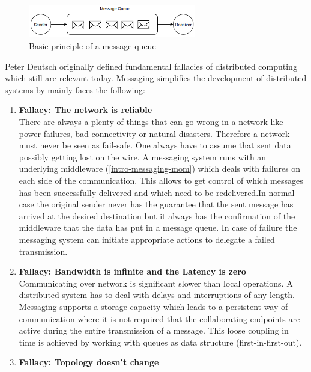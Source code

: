 \begin{figure}[H]
    \centering
    \includegraphics[width=0.65\textwidth]{images/messaging-simple.png}
    \caption{Basic principle of a message queue}
    \label{fig:messaging-simple}
\end{figure}
\newpage
Peter Deutsch originally defined fundamental fallacies of distributed computing
which still are relevant today.\cite{fallaciesOfDs} Messaging
simplifies the development of distributed systems by mainly faces the
following:

\begin{enumerate}
    \item{\textbf{Fallacy: The network is reliable} \hfill \\
        There are always a plenty of things that can go wrong in a network
       like power failures, bad connectivity or natural disasters. Therefore a
       network must never be seen as fail-safe. One always have to assume
       that sent data possibly getting lost on the wire. A messaging system
       runs with an underlying middleware (\ref{intro-messaging-mom})
       which deals with failures on each side of the communication. This allows to
       get control of which messages has been successfully delivered and which
       need to be redelivered.In normal case the original sender never has the
       guarantee that the sent message has arrived at the desired destination
       but it always has the confirmation of the middleware that the data has put in a
       message queue. In case of failure the messaging system can initiate
       appropriate actions to delegate a failed transmission.}   
    \item{\textbf{Fallacy: Bandwidth is infinite and the Latency is zero } \hfill \\
        Communicating over network is significant slower than local operations.
        A distributed system has to deal with delays and interruptions of any
        length. Messaging supports a storage capacity which leads to a
        persistent way of communication where it is not required that the
        collaborating endpoints are active during the entire transmission of a
        message. This loose coupling in time is achieved by working with queues
        as data structure (first-in-first-out).
        }
    \item{\textbf{Fallacy: Topology doesn't change} \hfill \\
}
\end{enumerate}
